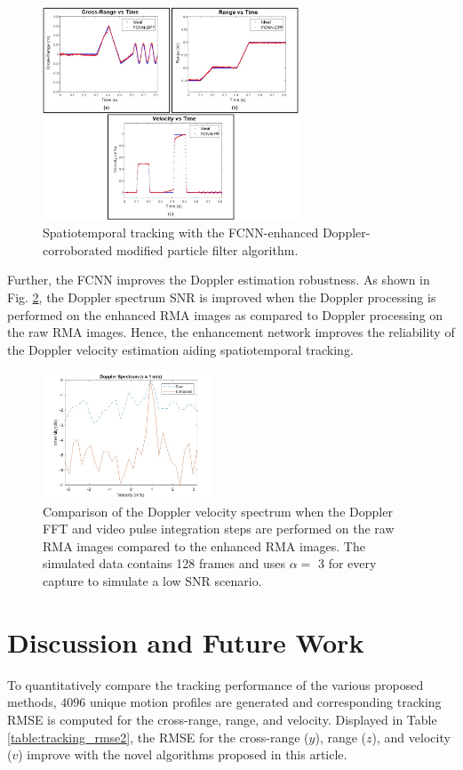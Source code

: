 \documentclass[10pt,journal,final]{IEEEtran}
\begin{document}
\begin{figure}[h]
	\centering
	\includegraphics[width=3in]{smith12.jpg}
	\caption{Spatiotemporal tracking with the FCNN-enhanced Doppler-corroborated modified particle filter algorithm.}
	\label{fig:fcnn_dpf_motion}
\end{figure}

Further, the FCNN improves the Doppler estimation robustness. 
As shown in Fig. \ref{fig:doppler_snr}, the Doppler spectrum SNR is improved when the Doppler processing is performed on the enhanced RMA images as compared to Doppler processing on the raw RMA images.
Hence, the enhancement network improves the reliability of the Doppler velocity estimation aiding spatiotemporal tracking.

\begin{figure}[h]
	\centering
	\includegraphics[width=2in]{smith13.jpg}
	\caption{Comparison of the Doppler velocity spectrum when the Doppler FFT and video pulse integration steps are performed on the raw RMA images compared to the enhanced RMA images. The simulated data contains 128 frames and uses $\alpha = $ 3 for every capture to simulate a low SNR scenario.}
	\label{fig:doppler_snr}
\end{figure}

\section{Discussion and Future Work}
\label{sec:discussion}

To quantitatively compare the tracking performance of the various proposed methods, $4096$ unique motion profiles are generated and corresponding tracking RMSE is computed for the cross-range, range, and velocity. 
Displayed in Table \ref{table:tracking_rmse2}, the RMSE for the cross-range ($y$), range ($z$), and velocity ($v$) improve with the novel algorithms proposed in this article. 
\end{document}
